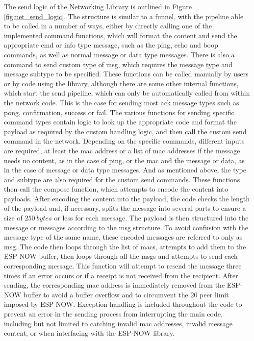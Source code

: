 The send logic of the Networking Library is outlined in Figure \ref{fig:net_send_logic}. The structure is similar to a funnel, with the pipeline able to be called in a number of ways, either by directly calling one of the implemented command functions, which will format the content and send the appropriate cmd or info type message, such as the ping, echo and boop commands, as well as normal message or data type messages. There is also a command to send custom type of msg, which requires the message type and message subtype to be specified. These functions can be called manually by users or by code using the library, although there are some other internal functions, which start the send pipeline, which can only be automatically called from within the network code. This is the case for sending most ack message types such as pong, confirmation, success or fail. The various functions for sending specific command types contain logic to look up the appropriate code and format the payload as required by the custom handling logic, and then call the custom send command in the network. Depending on the specific commands, different inputs are required, at least the mac address or a list of mac addresses if the message needs no content, as in the case of ping, or the mac and the message or data, as in the case of message or data type messages. And as mentioned above, the type and subtype are also required for the custom send commands. These functions then call the compose function, which attempts to encode the content into payloads. After encoding the content into the payload, the code checks the length of the payload and, if necessary, splits the message into several parts to ensure a size of $250\ bytes$ or less for each message. The payload is then structured into the message or messages according to the msg structure. To avoid confusion with the message type of the same name, these encoded messages are referred to only as msg. The code then loops through the list of macs, attempts to add them to the ESP-NOW buffer, then loops through all the msgs and attempts to send each corresponding message. This function will attempt to resend the message three times if an error occurs or if a receipt is not received from the recipient. After sending, the corresponding mac address is immediately removed from the ESP-NOW buffer to avoid a buffer overflow and to circumvent the 20 peer limit imposed by ESP-NOW. Exception handling is included throughout the code to prevent an error in the sending process from interrupting the main code, including but not limited to catching invalid mac addresses, invalid message content, or when interfacing with the ESP-NOW library.

